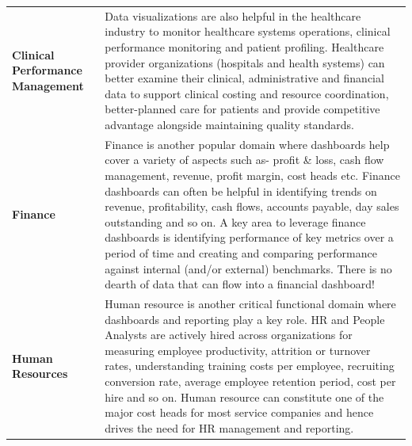 \documentclass[]{book}
\begin{document}
\begin{longtable}[]{@{}ll@{}}
\begin{minipage}[t]{0.15\columnwidth}\raggedright
\textbf{Clinical Performance Management}\strut
\end{minipage} & \begin{minipage}[t]{0.79\columnwidth}\raggedright
Data visualizations are also helpful in the healthcare industry to monitor healthcare systems operations, clinical performance monitoring and patient profiling. Healthcare provider organizations (hospitals and health systems) can better examine their clinical, administrative and financial data to support clinical costing and resource coordination, better-planned care for patients and provide competitive advantage alongside maintaining quality standards.\strut
\end{minipage}\tabularnewline
\begin{minipage}[t]{0.15\columnwidth}\raggedright
\textbf{Finance}\strut
\end{minipage} & \begin{minipage}[t]{0.79\columnwidth}\raggedright
Finance is another popular domain where dashboards help cover a variety of aspects such as- profit \& loss, cash flow management, revenue, profit margin, cost heads etc. Finance dashboards can often be helpful in identifying trends on revenue, profitability, cash flows, accounts payable, day sales outstanding and so on. A key area to leverage finance dashboards is identifying performance of key metrics over a period of time and creating and comparing performance against internal (and/or external) benchmarks. There is no dearth of data that can flow into a financial dashboard!\strut
\end{minipage}\tabularnewline
\begin{minipage}[t]{0.15\columnwidth}\raggedright
\textbf{Human Resources}\strut
\end{minipage} & \begin{minipage}[t]{0.79\columnwidth}\raggedright
Human resource is another critical functional domain where dashboards and reporting play a key role. HR and People Analysts are actively hired across organizations for measuring employee productivity, attrition or turnover rates, understanding training costs per employee, recruiting conversion rate, average employee retention period, cost per hire and so on. Human resource can constitute one of the major cost heads for most service companies and hence drives the need for HR management and reporting.\strut
\end{minipage}\tabularnewline
\bottomrule
\end{longtable}
\end{document}
